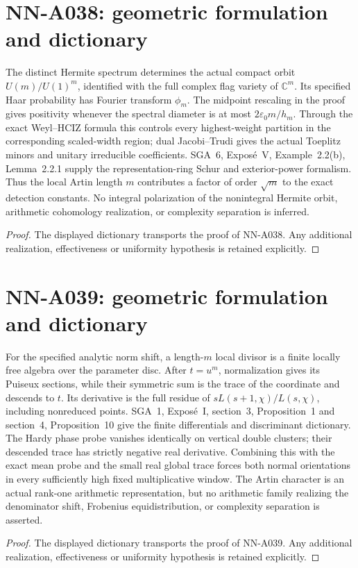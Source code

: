 \section{NN-A038: geometric formulation and dictionary}
\begin{geometricstatement}[NN-A038]
The distinct Hermite spectrum determines the actual compact orbit $U(m)/U(1)^m$, identified with the full complex flag variety of $\mathbb C^m$. Its specified Haar probability has Fourier transform $\phi_m$. The midpoint rescaling in the proof gives positivity whenever the spectral diameter is at most $2\varepsilon_0m/h_m$. Through the exact Weyl--HCIZ formula this controls every highest-weight partition in the corresponding scaled-width region; dual Jacobi--Trudi gives the actual Toeplitz minors and unitary irreducible coefficients. SGA~6, Expos\'e~V, Example~2.2(b), Lemma~2.2.1 supply the representation-ring Schur and exterior-power formalism. Thus the local Artin length $m$ contributes a factor of order $\sqrt m$ to the exact detection constants. No integral polarization of the nonintegral Hermite orbit, arithmetic cohomology realization, or complexity separation is inferred.
\end{geometricstatement}
\begin{proof} The displayed dictionary transports the proof of NN-A038. Any additional realization, effectiveness or uniformity hypothesis is retained explicitly.\end{proof}


\section{NN-A039: geometric formulation and dictionary}
\begin{geometricstatement}[NN-A039]
For the specified analytic norm shift, a length-$m$ local divisor is a finite locally free algebra over the parameter disc. After $t=u^m$, normalization gives its Puiseux sections, while their symmetric sum is the trace of the coordinate and descends to $t$. Its derivative is the full residue of $sL(s+1,\chi)/L(s,\chi)$, including nonreduced points. SGA~1, Expos\'e~I, section~3, Proposition~1 and section~4, Proposition~10 give the finite differentials and discriminant dictionary. The Hardy phase probe vanishes identically on vertical double clusters; their descended trace has strictly negative real derivative. Combining this with the exact mean probe and the small real global trace forces both normal orientations in every sufficiently high fixed multiplicative window. The Artin character is an actual rank-one arithmetic representation, but no arithmetic family realizing the denominator shift, Frobenius equidistribution, or complexity separation is asserted.
\end{geometricstatement}
\begin{proof} The displayed dictionary transports the proof of NN-A039. Any additional realization, effectiveness or uniformity hypothesis is retained explicitly.\end{proof}


